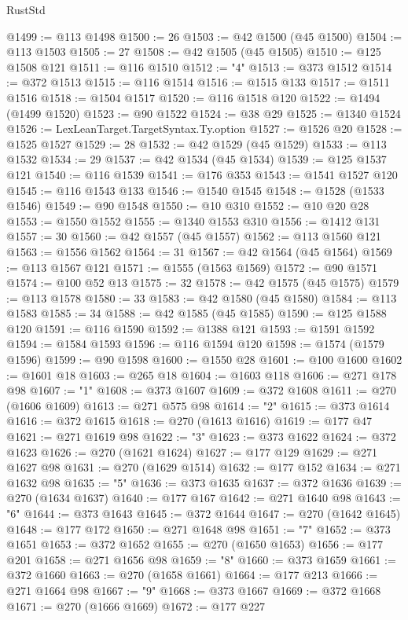 \begin{lexlean}{RustStd}
\begin{coremodule}
@1499 := @113 @1498
@1500 := 26
@1503 := @42 @1500 (@45 @1500)
@1504 := @113 @1503
@1505 := 27
@1508 := @42 @1505 (@45 @1505)
@1510 := @125 @1508 @121
@1511 := @116 @1510
@1512 := "4"
@1513 := @373 @1512
@1514 := @372 @1513
@1515 := @116 @1514
@1516 := @1515 @133
@1517 := @1511 @1516
@1518 := @1504 @1517
@1520 := @116 @1518 @120
@1522 := @1494 (@1499 @1520)
@1523 := @90 @1522
@1524 := @38 @29
@1525 := @1340 @1524
@1526 := LexLeanTarget.TargetSyntax.Ty.option
@1527 := @1526 @20
@1528 := @1525 @1527
@1529 := 28
@1532 := @42 @1529 (@45 @1529)
@1533 := @113 @1532
@1534 := 29
@1537 := @42 @1534 (@45 @1534)
@1539 := @125 @1537 @121
@1540 := @116 @1539
@1541 := @176 @353
@1543 := @1541 @1527 @120
@1545 := @116 @1543 @133
@1546 := @1540 @1545
@1548 := @1528 (@1533 @1546)
@1549 := @90 @1548
@1550 := @10 @310
@1552 := @10 @20 @28
@1553 := @1550 @1552
@1555 := @1340 @1553 @310
@1556 := @1412 @131
@1557 := 30
@1560 := @42 @1557 (@45 @1557)
@1562 := @113 @1560 @121
@1563 := @1556 @1562
@1564 := 31
@1567 := @42 @1564 (@45 @1564)
@1569 := @113 @1567 @121
@1571 := @1555 (@1563 @1569)
@1572 := @90 @1571
@1574 := @100 @52 @13
@1575 := 32
@1578 := @42 @1575 (@45 @1575)
@1579 := @113 @1578
@1580 := 33
@1583 := @42 @1580 (@45 @1580)
@1584 := @113 @1583
@1585 := 34
@1588 := @42 @1585 (@45 @1585)
@1590 := @125 @1588 @120
@1591 := @116 @1590
@1592 := @1388 @121
@1593 := @1591 @1592
@1594 := @1584 @1593
@1596 := @116 @1594 @120
@1598 := @1574 (@1579 @1596)
@1599 := @90 @1598
@1600 := @1550 @28
@1601 := @100 @1600
@1602 := @1601 @18
@1603 := @265 @18
@1604 := @1603 @118
@1606 := @271 @178 @98
@1607 := "1"
@1608 := @373 @1607
@1609 := @372 @1608
@1611 := @270 (@1606 @1609)
@1613 := @271 @575 @98
@1614 := "2"
@1615 := @373 @1614
@1616 := @372 @1615
@1618 := @270 (@1613 @1616)
@1619 := @177 @47
@1621 := @271 @1619 @98
@1622 := "3"
@1623 := @373 @1622
@1624 := @372 @1623
@1626 := @270 (@1621 @1624)
@1627 := @177 @129
@1629 := @271 @1627 @98
@1631 := @270 (@1629 @1514)
@1632 := @177 @152
@1634 := @271 @1632 @98
@1635 := "5"
@1636 := @373 @1635
@1637 := @372 @1636
@1639 := @270 (@1634 @1637)
@1640 := @177 @167
@1642 := @271 @1640 @98
@1643 := "6"
@1644 := @373 @1643
@1645 := @372 @1644
@1647 := @270 (@1642 @1645)
@1648 := @177 @172
@1650 := @271 @1648 @98
@1651 := "7"
@1652 := @373 @1651
@1653 := @372 @1652
@1655 := @270 (@1650 @1653)
@1656 := @177 @201
@1658 := @271 @1656 @98
@1659 := "8"
@1660 := @373 @1659
@1661 := @372 @1660
@1663 := @270 (@1658 @1661)
@1664 := @177 @213
@1666 := @271 @1664 @98
@1667 := "9"
@1668 := @373 @1667
@1669 := @372 @1668
@1671 := @270 (@1666 @1669)
@1672 := @177 @227

\end{coremodule}
\end{lexlean}

